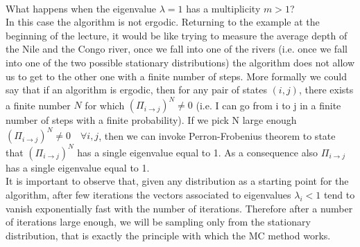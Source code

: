 \smallskip
\\
What happens when the eigenvalue $\lambda=1$ has a multiplicity $m>1$?
\smallskip
\\
In this case the algorithm is not ergodic. Returning to the example at the beginning of the lecture, it would be like trying to measure the average depth of the Nile and the Congo river, once we fall into one of the rivers (i.e. once we fall into one of the two possible stationary distributions) the algorithm does not allow us to get to the other one with a finite number of steps.
More formally we could say that if an algorithm is ergodic, then for any pair of states $\left(i,j\right)$, there exists a finite number $N$ for which $\left(\Pi_{i \rightarrow j}\right)^N \neq 0$ (i.e. I can go from i to j in a finite number of steps with a finite probability). If we pick N large enough $\left(\Pi_{i \rightarrow j}\right)^N \neq 0 \quad \forall i,j$, then we can invoke Perron-Frobenius theorem to state that $\left(\Pi_{i \rightarrow j}\right)^N$ has a single eigenvalue equal to 1. As a consequence also $\Pi_{i \rightarrow j}$ has a single eigenvalue equal to 1.
\smallskip
\\
It is important to observe that, given any distribution as a starting point for the algorithm, after few iterations the vectors associated to eigenvalues $\lambda_i<1$ tend to vanish exponentially fast with the number of iterations. Therefore after a number of iterations large enough, we will be sampling only from the stationary distribution, that is exactly the principle with which the MC method works.
